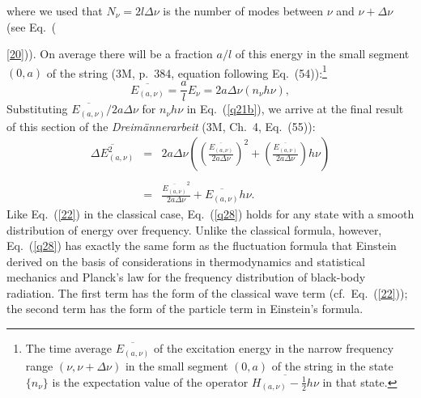 \documentclass[12pt]{elsart}
\begin{document}
where we used that $N_\nu = 2l \Delta \nu$ is the number of modes between $\nu$ and $\nu + \Delta \nu$ (see Eq.\ ({\ref{20})).
On average there will be a fraction $a/l$ of this energy in the small segment $(0,a)$ of the string (3M, p.\ 384, equation following Eq.\ (54)):\footnote{The time average $\overline{E_{(a, \nu)}}$ of the excitation energy  in the narrow frequency range $(\nu, \nu + \Delta \nu)$ in the small segment $(0,a)$ of the string in the state $\{ n_\nu \}$  is the expectation value of the operator $\overline{H_{(a, \nu)} - \frac{1}{2} h \nu}$ in that state.} 
\begin{equation}
\overline{E_{(a, \nu)}} = \frac{a}{l} E_\nu = 2 a \Delta \nu (n_\nu h \nu),
\label{q25}
\end{equation}
Substituting $\overline{E_{(a, \nu)}}/2a\Delta \nu$ for $n_\nu  h \nu$ in Eq.\ (\ref{q21b}), we arrive at the final result of this section of the {\it Dreim\"annerarbeit} (3M, Ch.\ 4, Eq.\ (55)):
\begin{eqnarray}
\overline{\Delta E_{(a, \nu)}^2} &
=  & 2a \Delta \nu \left( \left( \frac{\overline{E_{(a, \nu)}}}{2a\Delta \nu} \right)^2 
 + \left( \frac{\overline{E_{(a, \nu)}}}{2a\Delta \nu} \right) h \nu \right) \nonumber \\
 & &  \label{q28} \\
 & = &   \frac{\overline{E_{(a, \nu)}}^2}{2a\Delta \nu} + \overline{E_{(a, \nu)}} h \nu. \nonumber
\end{eqnarray}
Like Eq.\ (\ref{22}) in the classical case, Eq.\ (\ref{q28}) holds for any state with a smooth distribution of energy over frequency. Unlike the classical formula, however, Eq.\ (\ref{q28}) has exactly the same form as the fluctuation formula that Einstein derived on the basis of considerations in thermodynamics and statistical mechanics and Planck's law for the frequency distribution of black-body radiation. The first term has the form of the classical wave term (cf.\ Eq.\ (\ref{22})); the second term has the form of the particle term in Einstein's formula. 

}
\end{document}
